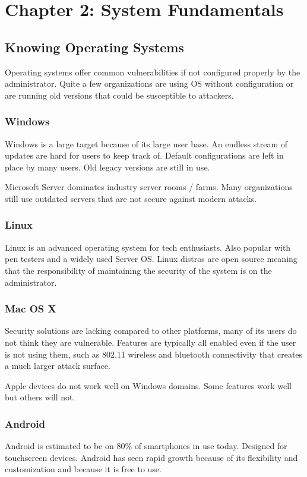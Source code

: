 \section{Chapter 2: System Fundamentals}
\subsection{Knowing Operating Systems}
Operating systems offer common vulnerabilities if not configured properly by the administrator.
Quite a few organizations are using OS without configuration or are running old versions that could be susceptible to attackers.

\subsubsection{Windows}
Windows is a large target because of its large user base.
An endless stream of updates are hard for users to keep track of.
Default configurations are left in place by many users.
Old legacy versions are still in use.

Microsoft Server dominates industry server rooms / farms.
Many organizations still use outdated servers that are not secure against modern attacks.

\subsubsection{Linux}
Linux is an advanced operating system for tech enthusiasts. Also popular with pen testers and a widely used Server OS. Linux distros are open source meaning that the responsibility of maintaining the security of the system is on the administrator.

\subsubsection{Mac OS X}
Security solutions are lacking compared to other platforms, many of its users do not think they are vulnerable.
Features are typically all enabled even if the user is not using them, such as 802.11 wireless and bluetooth connectivity that creates a much larger attack surface.

Apple devices do not work well on Windows domains.
Some features work well but others will not.

\subsubsection{Android}
Android is estimated to be on 80\% of smartphones in use today.
Designed for touchscreen devices.
Android has seen rapid growth because of its flexibility and customization and because it is free to use.

